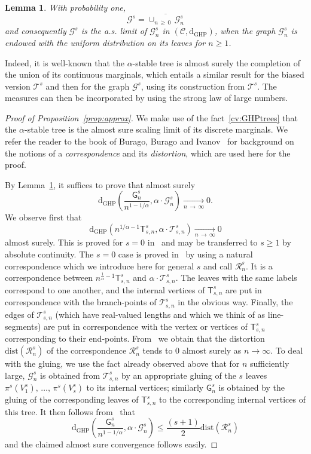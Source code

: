 \documentclass[10pt]{amsart}
\newtheorem{lemm}[theo]{Lemma}\newtheorem{prop}[theo]{Proposition}\newtheorem{coro}[theo]{Corollary}\newtheorem{conj}[theo]{Conjecture}
\theoremstyle{definition}\newtheorem{defi}[theo]{Definition}\newtheorem{rema}[theo]{Remark}\newtheorem{exam}[theo]{Example}\newtheorem{exem}[theo]{Example}\newtheorem{nota}[theo]{Notation}
\newcommand{\GHP}{\mathrm{GHP}}
\newcommand{\rmd}{\mathrm{d}}
\newcommand{\dist}{\mathrm{dist}}
\newcommand{\cG}{\mathcal{G}}
\newcommand{\cT}{\mathcal{T}}
\newcommand{\cR}{\mathcal{R}}
\newcommand{\sG}{\mathsf{G}}
\newcommand{\sT}{\mathsf{T}}
\newcommand{\scrC}{\mathscr{C}}
\begin{document}
\begin{lemm}\label{lem:density}
With probability one,
\[
\cG^s= \overline{\cup_{n\,\geq\,0}\,\cG^s_n}
\]
and consequently $\cG^s$ is the a.s. limit of $\cG^s_n$ in $(\scrC,\rmd_{\GHP})$, when the graph $\cG_n^s$ is endowed with the uniform distribution on its leaves for $n \ge 1$.
\end{lemm}

Indeed, it is well-known that the $\alpha$-stable tree is almost surely the completion of the union of its continuous marginals, which entails a similar result for the biased version $\cT^s$ and then for the graph $\cG^s$, using its construction from $\cT^s$. The measures can then be incorporated by using the strong law of large numbers.

\begin{proof}[Proof of Proposition~\ref{prop:approx}] We make use of the fact~\eqref{cv:GHPtrees} that the $\alpha$-stable tree is the almost sure scaling limit of its discrete marginals. We refer the reader to the book of Burago, Burago and Ivanov~\cite{BBI01} for background on the notions of a \emph{correspondence} and its \emph{distortion}, which are used here for the proof.

By Lemma~\ref{lem:density}, it suffices to prove that almost surely
\[
\rmd_{\GHP}\left(\frac{\sG_n^s}{n^{1-1/\alpha}}, \alpha \cdot \cG_n^s \right) \underset{n\,\rightarrow\,\infty}\longrightarrow 0.
\]
We observe first that
\[
\rmd_{\GHP} \left(n^{1/\alpha - 1} \sT_{s,n}^{s}, \alpha \cdot \cT_{s,n}^s\right) \underset{n \,\rightarrow\,\infty}\longrightarrow 0
\]
almost surely. This is proved for $s = 0$ in~\cite[Section~2.4]{CurienHaas} and may be transferred to $s \ge 1$ by absolute continuity. The $s = 0$ case is proved in~\cite{CurienHaas} by using a natural correspondence which we introduce here for general $s$ and call $\cR_n^s$. It is a correspondence between $n^{\frac{1}{\alpha}-1} \sT^s_{s,n}$ and $\alpha \cdot \cT^s_{s,n}$. The leaves with the same labels correspond to one another, and the internal vertices of $\sT^s_{s,n}$ are put in correspondence with the branch-points of $\cT_{s,n}^s$ in the obvious way. Finally, the edges of $\cT_{s,n}^s$ (which have real-valued lengths and which we think of as line-segments) are put in correspondence with the vertex or vertices of $\sT_{s,n}^s$ corresponding to their end-points. From~\cite{CurienHaas} we obtain that the distortion $\dist(\cR_n^s)$ of the correspondence $\cR_n^s$ tends to 0 almost surely as $n \to \infty$. To deal with the gluing, we use the fact already observed above that for $n$ sufficiently large, $\cG_n^s$ is obtained from $\cT^s_{s,n}$ by an appropriate gluing of the $s$ leaves $\pi^s(V_1^s),\,\ldots,\, \pi^s(V_s^s)$ to its internal vertices; similarly $\sG_n^s$ is obtained by the gluing of the corresponding leaves of $\sT^s_{s,n}$ to the corresponding internal vertices of this tree. It then follows from~\cite[Lemma~4.2]{ABBrGoMi} that
\[
\rmd_{\GHP}\left(\frac{\sG_n^s}{n^{1-1/\alpha}}, \alpha \cdot \cG_n^s \right) \le \frac{(s+1)}{2} \dist\left(\cR_n^s\right)
\]
and the claimed almost sure convergence follows easily.
\end{proof}
\end{document}
